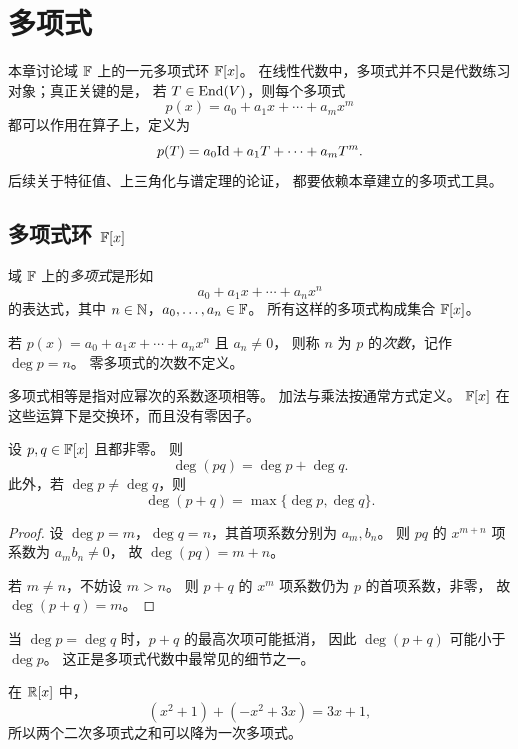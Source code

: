 \chapter{多项式}

本章讨论域 $\mathbb{F}$ 上的一元多项式环 $\mathbb{F}[x]$。
在线性代数中，多项式并不只是代数练习对象；真正关键的是，
若 $T\in\mathrm{End}(V)$，则每个多项式
\[
p(x)=a_0+a_1x+\cdots+a_mx^m
\]
都可以作用在算子上，定义为
\[
p(T)=a_0\mathrm{Id}+a_1T+\cdots+a_mT^m.
\]
后续关于特征值、上三角化与谱定理的论证，
都要依赖本章建立的多项式工具。

\section{多项式环 $\mathbb{F}[x]$}

\begin{definition}
域 $\mathbb{F}$ 上的\emph{多项式}是形如
\[
a_0+a_1x+\cdots+a_nx^n
\]
的表达式，其中 $n\in\mathbb{N}$，$a_0,\dots,a_n\in\mathbb{F}$。
所有这样的多项式构成集合 $\mathbb{F}[x]$。
\end{definition}

\begin{definition}
若 $p(x)=a_0+a_1x+\cdots+a_nx^n$ 且 $a_n\neq 0$，
则称 $n$ 为 $p$ 的\emph{次数}，记作 $\deg p=n$。
零多项式的次数不定义。
\end{definition}

多项式相等是指对应幂次的系数逐项相等。
加法与乘法按通常方式定义。
$\mathbb{F}[x]$ 在这些运算下是交换环，而且没有零因子。

\begin{proposition}
设 $p,q\in\mathbb{F}[x]$ 且都非零。
则
\[
\deg(pq)=\deg p+\deg q.
\]
此外，若 $\deg p\neq \deg q$，则
\[
\deg(p+q)=\max\{\deg p,\deg q\}.
\]
\end{proposition}

\begin{proof}
设 $\deg p=m$，$\deg q=n$，其首项系数分别为 $a_m,b_n$。
则 $pq$ 的 $x^{m+n}$ 项系数为 $a_mb_n\neq 0$，
故 $\deg(pq)=m+n$。

若 $m\neq n$，不妨设 $m>n$。
则 $p+q$ 的 $x^m$ 项系数仍为 $p$ 的首项系数，非零，
故 $\deg(p+q)=m$。
\end{proof}

\begin{remark}
当 $\deg p=\deg q$ 时，$p+q$ 的最高次项可能抵消，
因此 $\deg(p+q)$ 可能小于 $\deg p$。
这正是多项式代数中最常见的细节之一。
\end{remark}

\begin{example}
在 $\mathbb{R}[x]$ 中，
\[
(x^2+1)+( -x^2+3x)=3x+1,
\]
所以两个二次多项式之和可以降为一次多项式。
\end{example}

